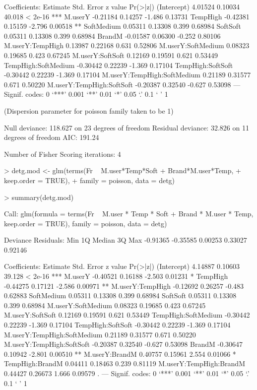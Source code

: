 \documentclass{article}
\begin{document}
\begin{Schunk}
\begin{Soutput}
Coefficients:
                            Estimate Std. Error z value Pr(>|z|)    
(Intercept)                  4.01524    0.10034  40.018  < 2e-16 ***
M.userY                     -0.21184    0.14257  -1.486  0.13731    
TempHigh                    -0.42381    0.15159  -2.796  0.00518 ** 
SoftMedium                   0.05311    0.13308   0.399  0.68984    
SoftSoft                     0.05311    0.13308   0.399  0.68984    
BrandM                      -0.01587    0.06300  -0.252  0.80106    
M.userY:TempHigh             0.13987    0.22168   0.631  0.52806    
M.userY:SoftMedium           0.08323    0.19685   0.423  0.67245    
M.userY:SoftSoft             0.12169    0.19591   0.621  0.53449    
TempHigh:SoftMedium         -0.30442    0.22239  -1.369  0.17104    
TempHigh:SoftSoft           -0.30442    0.22239  -1.369  0.17104    
M.userY:TempHigh:SoftMedium  0.21189    0.31577   0.671  0.50220    
M.userY:TempHigh:SoftSoft   -0.20387    0.32540  -0.627  0.53098    
---
Signif. codes:  0 ‘***’ 0.001 ‘**’ 0.01 ‘*’ 0.05 ‘.’ 0.1 ‘ ’ 1

(Dispersion parameter for poisson family taken to be 1)

    Null deviance: 118.627  on 23  degrees of freedom
Residual deviance:  32.826  on 11  degrees of freedom
AIC: 191.24

Number of Fisher Scoring iterations: 4


> detg.mod <- glm(terms(Fr ~ M.user*Temp*Soft + Brand*M.user*Temp,
+                       keep.order = TRUE),
+ 		family = poisson, data = detg)

> summary(detg.mod)

Call:
glm(formula = terms(Fr ~ M.user * Temp * Soft + Brand * M.user * 
    Temp, keep.order = TRUE), family = poisson, data = detg)

Deviance Residuals: 
     Min        1Q    Median        3Q       Max  
-0.91365  -0.35585   0.00253   0.33027   0.92146  

Coefficients:
                            Estimate Std. Error z value Pr(>|z|)    
(Intercept)                  4.14887    0.10603  39.128  < 2e-16 ***
M.userY                     -0.40521    0.16188  -2.503  0.01231 *  
TempHigh                    -0.44275    0.17121  -2.586  0.00971 ** 
M.userY:TempHigh            -0.12692    0.26257  -0.483  0.62883    
SoftMedium                   0.05311    0.13308   0.399  0.68984    
SoftSoft                     0.05311    0.13308   0.399  0.68984    
M.userY:SoftMedium           0.08323    0.19685   0.423  0.67245    
M.userY:SoftSoft             0.12169    0.19591   0.621  0.53449    
TempHigh:SoftMedium         -0.30442    0.22239  -1.369  0.17104    
TempHigh:SoftSoft           -0.30442    0.22239  -1.369  0.17104    
M.userY:TempHigh:SoftMedium  0.21189    0.31577   0.671  0.50220    
M.userY:TempHigh:SoftSoft   -0.20387    0.32540  -0.627  0.53098    
BrandM                      -0.30647    0.10942  -2.801  0.00510 ** 
M.userY:BrandM               0.40757    0.15961   2.554  0.01066 *  
TempHigh:BrandM              0.04411    0.18463   0.239  0.81119    
M.userY:TempHigh:BrandM      0.44427    0.26673   1.666  0.09579 .  
---
Signif. codes:  0 ‘***’ 0.001 ‘**’ 0.01 ‘*’ 0.05 ‘.’ 0.1 ‘ ’ 1


\end{Soutput}
\end{Schunk}
\end{document}
